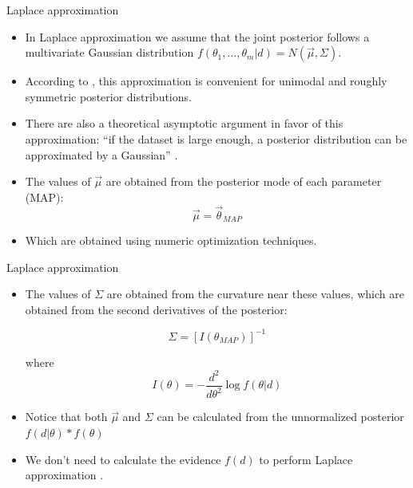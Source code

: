\documentclass[handout]{beamer}
\begin{document}
\begin{frame}{Laplace approximation}
\scriptsize{

\begin{itemize}
\item In Laplace approximation we assume that the joint posterior follows a multivariate Gaussian distribution $f(\theta_1,\dots,\theta_m|d) = N(\vec{\mu},\Sigma)$.

\item  According to \cite{gelman2013bayesian}, this approximation is convenient for unimodal and roughly symmetric posterior distributions.

\item There are also a theoretical asymptotic argument in favor of this approximation: ``if the dataset is large enough, a posterior distribution can be approximated by a Gaussian'' \cite{gelman2013bayesian}.

\item The values of $\vec{\mu}$ are obtained from the posterior mode of each parameter (MAP):
\begin{displaymath}
 \vec{\mu} = \vec{\theta}_{MAP}
\end{displaymath}

\item Which are obtained using numeric optimization techniques.


\end{itemize}


} 
\end{frame}



\begin{frame}{Laplace approximation}
\scriptsize{

\begin{itemize}

\item The values of $\Sigma$ are obtained from the curvature near these values, which are obtained from the second derivatives of the posterior:

\begin{displaymath}
 \Sigma = [I({\theta}_{MAP})]^{-1}
\end{displaymath}

where  \begin{displaymath}
        I(\theta) = - \frac{d^2}{d\theta^2} \log f(\theta|d)
       \end{displaymath}



\item Notice that both  $\vec{\mu}$ and $\Sigma$ can be calculated from the unnormalized posterior 
$f(d|\theta)*f(\theta)$

\item We don't need to calculate the evidence $f(d)$ to perform Laplace approximation \cite{laplaceApp}.

\end{itemize}


} 
\end{frame}
\end{document}

